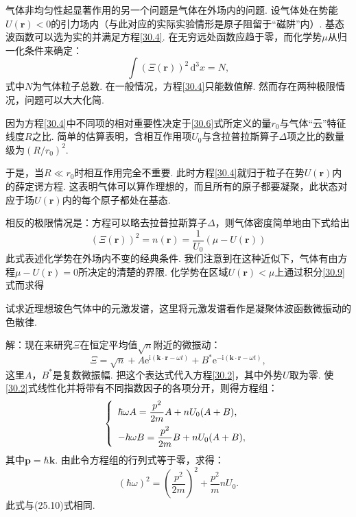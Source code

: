 气体非均匀性起显著作用的另一个问题是气体在外场内的问题. 设气体处在势能$U(\bm{r})<0$的引力场内（与此对应的实际实验情形是原子阻留于“磁阱”内）. 基态波函数可以选为实的并满足方程\eqref{30.4}. 在无穷远处函数应趋于零，而化学势$\mu$从归一化条件来确定：
\begin{equation}
\int(\Xi(\bm{r}))^{2}\,\mathrm{d}^{3}x=N,
\label{30.8}
\end{equation}
式中$N$为气体粒子总数. 在一般情况，方程\eqref{30.4}只能数值解. 然而存在两种极限情况，问题可以大大化简.

因为方程\eqref{30.4}中不同项的相对重要性决定于\eqref{30.6}式所定义的量$r_{0}$与气体“云”特征线度$R$之比. 简单的估算表明，含相互作用项$U_{0}$与含拉普拉斯算子$\Delta$项之比的数量级为$(R/r_{0})^{2}$.

于是，当$R\ll r_{0}$时相互作用完全不重要. 此时方程\eqref{30.4}就归于粒子在势$U(\bm{r})$内的薛定谔方程. 这表明气体可以算作理想的，而且所有的原子都要凝聚，此状态对应于场$U(\bm{r})$内的每个原子都处在基态.

相反的极限情况是：方程可以略去拉普拉斯算子$\Delta$，则气体密度简单地由下式给出
\begin{equation}
(\Xi(\bm{r}))^{2}=n(\bm{r})=\frac{1}{U_{0}}(\mu-U(\bm{r}))
\label{30.9}
\end{equation}
此式表述化学势在外场内不变的经典条件. 我们注意到在这种近似下，气体有由方程$\mu-U(\bm{r})=0$所决定的清楚的界限. 化学势在区域$U(\bm{r})<\mu$上通过积分\eqref{30.9}式而求得

\begin{xiti}

试求近理想玻色气体中的元激发谱，这里将元激发谱看作是凝聚体波函数微振动的色散律.

{\heiti 解：}现在来研究$\Xi$在恒定平均值$\sqrt{n}$附近的微振动：
\begin{equation*}
\Xi=\sqrt{n}+A\mathrm{e}^{\mathrm{i}(\bm{k}\cdot\bm{r}-\omega t)}
+B^{*}\mathrm{e}^{-\mathrm{i}(\bm{k}\cdot\bm{r}-\omega t)},
\end{equation*}
这里$A$，$B^{*}$是复数微振幅. 把这个表达式代入方程\eqref{30.2}，其中外势$U$取为零. 使\eqref{30.2}式线性化并将带有不同指数因子的各项分开，则得方程组：
\begin{equation*}
\left\{\begin{array}{l l}
\hbar\omega A=\dfrac{p^{2}}{2m}A+nU_{0}(A+B),\\[0.8em]
-\hbar\omega B=\dfrac{p^{2}}{2m}B+nU_{0}(A+B),
\end{array}\right.
\end{equation*}
其中$\bm{p}=\hbar\bm{k}$. 由此令方程组的行列式等于零，求得：
\begin{equation*}
(\hbar\omega)^{2}=\left(\frac{p^{2}}{2m}\right)^{2}+\frac{p^{2}}{m}nU_{0}.
\end{equation*}
此式与(25.10)式相同.

\end{xiti}

